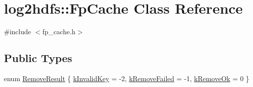 \hypertarget{classlog2hdfs_1_1FpCache}{}\section{log2hdfs\+:\+:Fp\+Cache Class Reference}
\label{classlog2hdfs_1_1FpCache}


{\ttfamily \#include $<$fp\+\_\+cache.\+h$>$}

\subsection*{Public Types}
\begin{DoxyCompactItemize}
\item 
enum \hyperlink{classlog2hdfs_1_1FpCache_a5a925c5b356be91cf262e5219dafdabe}{Remove\+Result} \{ \hyperlink{classlog2hdfs_1_1FpCache_a5a925c5b356be91cf262e5219dafdabea45c149a2991a004cc2f703028ee8f743}{k\+Invalid\+Key} = -\/2, 
\hyperlink{classlog2hdfs_1_1FpCache_a5a925c5b356be91cf262e5219dafdabea85a0c35bd500ce91be5a049be1e42b82}{k\+Remove\+Failed} = -\/1, 
\hyperlink{classlog2hdfs_1_1FpCache_a5a925c5b356be91cf262e5219dafdabea9fbf001dccee023203b54359e8928193}{k\+Remove\+Ok} = 0
 \}
\end{DoxyCompactItemize}
